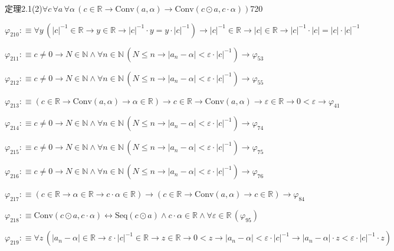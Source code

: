 \begin{fullproof}{定理2.1(2)}{$\forall c\,\forall a\,\forall \alpha\,(c \in \mathbb{R} \to \mathrm{Conv}(a,\alpha) \to \mathrm{Conv}(c \odot a,c \cdot \alpha))$}{720}
\begin{abbrevlist}
\item $\varphi_{210} :\equiv \forall y\,(\lvert c \rvert^{-1} \in \mathbb{R} \to y \in \mathbb{R} \to \lvert c \rvert^{-1} \cdot y = y \cdot \lvert c \rvert^{-1}) \to \lvert c \rvert^{-1} \in \mathbb{R} \to \lvert c \rvert \in \mathbb{R} \to \lvert c \rvert^{-1} \cdot \lvert c \rvert = \lvert c \rvert \cdot \lvert c \rvert^{-1}$
\item $\varphi_{211} :\equiv c \neq 0 \to N \in \mathbb{N} \land \forall n \in \mathbb{N}\,(N \leq n \to \lvert a_{n} - \alpha \rvert < \varepsilon \cdot \lvert c \rvert^{-1}) \to \varphi_{53}$
\item $\varphi_{212} :\equiv c \neq 0 \to N \in \mathbb{N} \land \forall n \in \mathbb{N}\,(N \leq n \to \lvert a_{n} - \alpha \rvert < \varepsilon \cdot \lvert c \rvert^{-1}) \to \varphi_{55}$
\item $\varphi_{213} :\equiv (c \in \mathbb{R} \to \mathrm{Conv}(a,\alpha) \to \alpha \in \mathbb{R}) \to c \in \mathbb{R} \to \mathrm{Conv}(a,\alpha) \to \varepsilon \in \mathbb{R} \to 0 < \varepsilon \to \varphi_{41}$
\item $\varphi_{214} :\equiv c \neq 0 \to N \in \mathbb{N} \land \forall n \in \mathbb{N}\,(N \leq n \to \lvert a_{n} - \alpha \rvert < \varepsilon \cdot \lvert c \rvert^{-1}) \to \varphi_{74}$
\item $\varphi_{215} :\equiv c \neq 0 \to N \in \mathbb{N} \land \forall n \in \mathbb{N}\,(N \leq n \to \lvert a_{n} - \alpha \rvert < \varepsilon \cdot \lvert c \rvert^{-1}) \to \varphi_{75}$
\item $\varphi_{216} :\equiv c \neq 0 \to N \in \mathbb{N} \land \forall n \in \mathbb{N}\,(N \leq n \to \lvert a_{n} - \alpha \rvert < \varepsilon \cdot \lvert c \rvert^{-1}) \to \varphi_{76}$
\item $\varphi_{217} :\equiv (c \in \mathbb{R} \to \alpha \in \mathbb{R} \to c \cdot \alpha \in \mathbb{R}) \to (c \in \mathbb{R} \to \mathrm{Conv}(a,\alpha) \to c \in \mathbb{R}) \to \varphi_{84}$
\item $\varphi_{218} :\equiv \mathrm{Conv}(c \odot a,c \cdot \alpha) \leftrightarrow \mathrm{Seq}(c \odot a) \land c \cdot \alpha \in \mathbb{R} \land \forall \varepsilon \in \mathbb{R}\,(\varphi_{95})$
\item $\varphi_{219} :\equiv \forall z\,(\lvert a_{n} - \alpha \rvert \in \mathbb{R} \to \varepsilon \cdot \lvert c \rvert^{-1} \in \mathbb{R} \to z \in \mathbb{R} \to 0 < z \to \lvert a_{n} - \alpha \rvert < \varepsilon \cdot \lvert c \rvert^{-1} \to \lvert a_{n} - \alpha \rvert \cdot z < \varepsilon \cdot \lvert c \rvert^{-1} \cdot z)$

\end{abbrevlist}
\end{fullproof}
